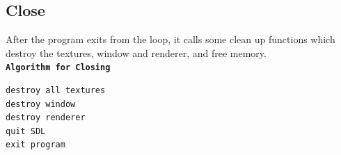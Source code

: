 \documentclass[report]{subfiles}
\begin{document}
    \subsection{Close}
    After the program exits from the loop, it calls some clean up functions which destroy the textures, window and renderer, and free memory.\\
        \textbf{\texttt{Algorithm for Closing}}
        \begin{verbatim}
destroy all textures
destroy window
destroy renderer
quit SDL
exit program
        \end{verbatim}
\end{document}
